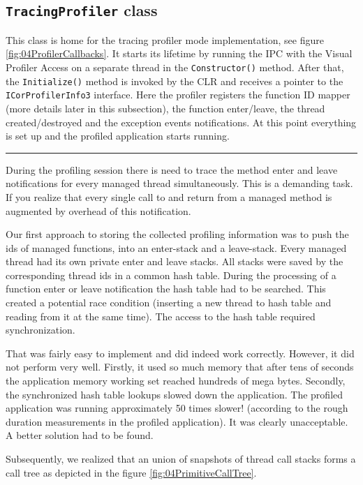\subsection{\texttt{TracingProfiler} class}
This class is home for the tracing profiler mode implementation, see figure \ref{fig:04ProfilerCallbacks}. It starts its lifetime by running the IPC with the Visual Profiler Access on a separate thread in the \texttt{Constructor()} method. After that, the \texttt{Initialize()} method is invoked by the CLR and receives a pointer to the \texttt{ICorProfilerInfo3} interface. Here the profiler registers the function ID mapper (more details later in this subsection), the function enter/leave, the thread created/destroyed and the exception events notifications. At this point everything is set up and the profiled application starts running.

\begin{center}
\rule{300pt}{1.5pt}
\end{center}
During the profiling session there is need to trace the method enter and leave notifications for every managed thread simultaneously. This is a demanding task. If you realize that every single call to and return from a managed method is augmented by overhead of this notification. 

Our first approach to storing the collected profiling information was to push the ids of managed functions, into an enter-stack and a leave-stack. Every managed thread had its own private enter and leave stacks. All stacks were saved by the corresponding thread ids in a common hash table. During the processing of a function enter or leave notification the hash table had to be searched. This created a potential race condition (inserting a new thread to hash table and reading from it at the same time). The access to the hash table required synchronization.

That was fairly easy to implement and did indeed work correctly. However, it did not perform very well. Firstly, it used so much memory that after tens of seconds the application memory working set reached hundreds of mega bytes. Secondly, the synchronized hash table lookups slowed down the application. The profiled application was running approximately 50 times slower! (according to the rough duration measurements in the profiled application). It was clearly unacceptable. A better solution had to be found. 

Subsequently, we realized that an union of snapshots of thread call stacks forms a call tree as depicted in the figure \ref{fig:04PrimitiveCallTree}.


